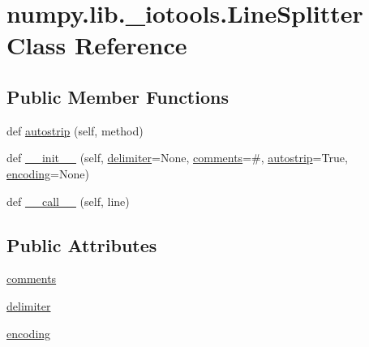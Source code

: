 \hypertarget{classnumpy_1_1lib_1_1__iotools_1_1LineSplitter}{}\section{numpy.\+lib.\+\_\+iotools.\+Line\+Splitter Class Reference}
\label{classnumpy_1_1lib_1_1__iotools_1_1LineSplitter}
\subsection*{Public Member Functions}
\begin{DoxyCompactItemize}
\item 
def \hyperlink{classnumpy_1_1lib_1_1__iotools_1_1LineSplitter_a1b01934e53f08697ddf883dba06e4f47}{autostrip} (self, method)
\item 
def \hyperlink{classnumpy_1_1lib_1_1__iotools_1_1LineSplitter_a2a1b4ab86f147d894ab93fa8dc2d8eae}{\+\_\+\+\_\+init\+\_\+\+\_\+} (self, \hyperlink{classnumpy_1_1lib_1_1__iotools_1_1LineSplitter_afbb2e93502c225065a527672baba0aea}{delimiter}=None, \hyperlink{classnumpy_1_1lib_1_1__iotools_1_1LineSplitter_acac01271b5da3339deedb3d537952a73}{comments}=\textquotesingle{}\#\textquotesingle{}, \hyperlink{classnumpy_1_1lib_1_1__iotools_1_1LineSplitter_a1b01934e53f08697ddf883dba06e4f47}{autostrip}=True, \hyperlink{classnumpy_1_1lib_1_1__iotools_1_1LineSplitter_a76cfbcd674a65e718a45e1944255cf20}{encoding}=None)
\item 
def \hyperlink{classnumpy_1_1lib_1_1__iotools_1_1LineSplitter_afb031e5ebdbe5dc2767872c029d2b1b5}{\+\_\+\+\_\+call\+\_\+\+\_\+} (self, line)
\end{DoxyCompactItemize}
\subsection*{Public Attributes}
\begin{DoxyCompactItemize}
\item 
\hyperlink{classnumpy_1_1lib_1_1__iotools_1_1LineSplitter_acac01271b5da3339deedb3d537952a73}{comments}
\item 
\hyperlink{classnumpy_1_1lib_1_1__iotools_1_1LineSplitter_afbb2e93502c225065a527672baba0aea}{delimiter}
\item 
\hyperlink{classnumpy_1_1lib_1_1__iotools_1_1LineSplitter_a76cfbcd674a65e718a45e1944255cf20}{encoding}
\end{DoxyCompactItemize}


